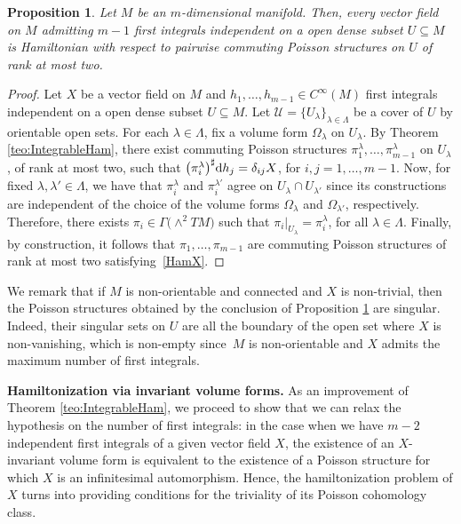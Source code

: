 \documentclass[pdftex]{sigma}%
\newcommand{\dd}{{\rm d}}
\numberwithin{equation}{section}
\newtheorem{Proposition}[Theorem]{Proposition}
 { \theoremstyle{definition}
\newtheorem{Definition}[Theorem]{Definition}
\newtheorem{Note}[Theorem]{Note}
\newtheorem{Example}[Theorem]{Example}
\newtheorem{Remark}[Theorem]{Remark} }
\begin{document}
\begin{Proposition}\label{prop:IntegrableHam}
Let $M$ be an $m$-dimensional manifold. Then, every vector field on $M$ admitting $m-1$ first integrals independent on a open dense subset $U\subseteq M$ is Hamiltonian with respect to pairwise commuting Poisson structures on $U$ of rank at most two.
\end{Proposition}
\begin{proof}
Let $X$ be a vector field on $M$ and $h_1, \dots, h_{m-1} \in C^{\infty}(M)$ first integrals independent on a open dense subset $U \subseteq M$. Let $\mathcal{U}=\{U_{\lambda}\}_{\lambda\in\Lambda}$ be a cover of $U$ by orientable open sets. For each $\lambda \in \Lambda$, fix a volume form $\Omega_{\lambda}$ on $U_{\lambda}$. By Theorem \ref{teo:IntegrableHam}, there exist commuting Poisson structures $\pi_{1}^{\lambda},\dots,\pi_{m-1}^{\lambda}$ on $U_{\lambda}$, of rank at most two, such that $\big(\pi_{i}^{\lambda}\big)^{\sharp}\dd h_{j} = \delta_{ij}X$, for $i,j=1,\dots,m-1$. Now, for fixed $\lambda,\lambda'\in\Lambda$, we have that $\pi_{i}^{\lambda}$ and $\pi_{i}^{\lambda'}$ agree on $U_{\lambda}\cap U_{\lambda'}$ since its constructions are independent of the choice of the volume forms $\Omega_{\lambda}$ and $\Omega_{\lambda'}$, respectively. Therefore, there exists $\pi_{i}\in\Gamma\big({\wedge}^2TM\big)$ such that $\pi_{i}|_{U_{\lambda}} = \pi_{i}^{\lambda}$, for all $\lambda \in \Lambda$. Finally, by construction, it follows that $\pi_1,\dots,\pi_{m-1}$ are commuting Poisson structures of rank at most two satisfying~\eqref{HamX}.
\end{proof}

We remark that if $M$ is non-orientable and connected and $X$ is non-trivial, then the Poisson structures obtained by the conclusion of Proposition \ref{prop:IntegrableHam} are singular. Indeed, their singular sets on $U$ are all the boundary of the open set where $X$ is non-vanishing, which is non-empty since~$M$ is non-orientable and $X$ admits the maximum number of first integrals.

{\bf Hamiltonization via invariant volume forms.} As an improvement of Theorem \ref{teo:IntegrableHam}, we proceed to show that we can relax the hypothesis on the number of first integrals: in the case when we have $m-2$ independent first integrals of a given vector field $X$, the existence of an $X$-invariant volume form is equivalent to the existence of a Poisson structure for which $X$ is an infinitesimal automorphism. Hence, the hamiltonization problem of $X$ turns into providing conditions for the triviality of its Poisson cohomology class.
\end{document}

